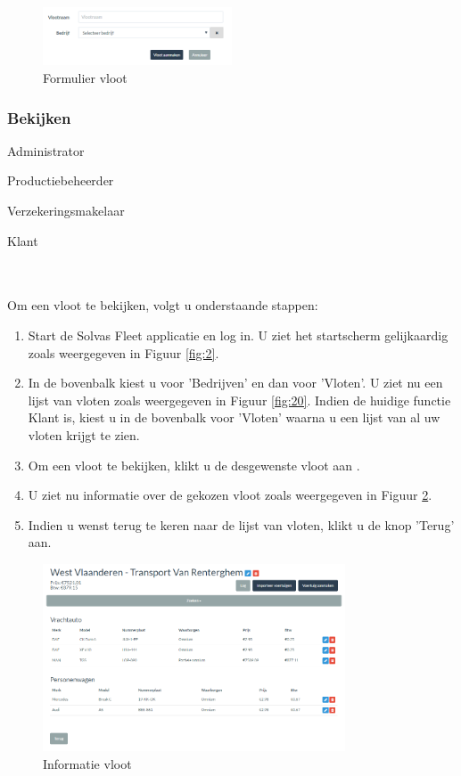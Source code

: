 \documentclass[11pt,openany]{article}
\newcommand{\cmark}{\ding{51}}%
\newcommand{\done}{\rlap{$\square$}{\raisebox{2pt}{\large\hspace{1pt}\cmark}}%
	\hspace{-2.5pt}}
\begin{document}
\begin{figure}
	\centering
	\includegraphics[width=0.5\textwidth]{img/fig21.png}
	\caption{Formulier vloot} 
	\label{fig:21} 
\end{figure}


\newpage
\subsubsection{Bekijken}
\label{fleet_show}
\begin{todolist}
	\item[\done] Administrator
	\item[\done] Productiebeheerder
	\item[\done] Verzekeringsmakelaar
	\item[\done] Klant 
\end{todolist}
\\
\\
Om een vloot te bekijken, volgt u onderstaande stappen:
\begin{enumerate}
	\item Start de Solvas Fleet applicatie en log in. U ziet het startscherm gelijkaardig zoals weergegeven in Figuur \ref{fig:2}.
	\item In de bovenbalk kiest u voor 'Bedrijven' en dan voor 'Vloten'. U ziet nu een lijst van vloten zoals weergegeven in Figuur \ref{fig:20}. Indien de huidige functie Klant is, kiest u in de bovenbalk voor 'Vloten' waarna u een lijst van al uw vloten krijgt te zien.
	\item Om een vloot te bekijken, klikt u de desgewenste vloot aan	. 
	\item U ziet nu informatie over de gekozen vloot zoals weergegeven in Figuur \ref{fig:22}. 
	\item Indien u wenst terug te keren naar de lijst van vloten, klikt u de knop 'Terug' aan.
\end{enumerate}

\begin{figure}
	\centering
	\includegraphics[width=0.8\textwidth]{img/fig22.png}
	\caption{Informatie vloot} 
	\label{fig:22} 
\end{figure}
\newpage
\end{document}
